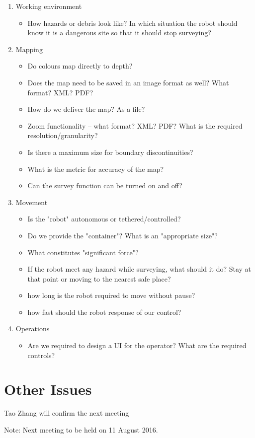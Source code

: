 \documentclass[11pt, a4paper]{article}
\begin{document}
\begin{enumerate}
\item Working environment
\begin{itemize}
\item How hazards or debris look like? In which situation the robot should know it is a dangerous site so that it should stop surveying?

\end{itemize}
\item Mapping
\begin{itemize}
\item Do colours map directly to depth?
\item Does the map need to be saved in an image format as well? What format? XML? PDF?
\item How do we deliver the map? As a file?
\item Zoom functionality -- what format? XML? PDF? What is the required resolution/granularity?
\item Is there a maximum size for boundary discontinuities?
\item What is the metric for accuracy of the map?
\item Can the survey function can be turned on and off?
\end{itemize}
\item Movement
\begin{itemize}
\item Is the "robot" autonomous or tethered/controlled?
\item Do we provide the "container"? What is an "appropriate size"?
\item What constitutes "significant force"?
\item If the robot meet any hazard while surveying, what should it do? Stay at that point or moving to the nearest safe place?
\item how long is the robot required to move without pause?
\item how fast should the robot response of our control?
\end{itemize}
\item Operations
\begin{itemize}
\item Are we required to design a UI for the operator? What are the required controls?
\end{itemize}
\end{enumerate}

\section{Other Issues}
Tao Zhang will confirm the next meeting

\vspace*{10pt}
\noindent Note: Next meeting to be held on 11 August 2016.
\end{document}
